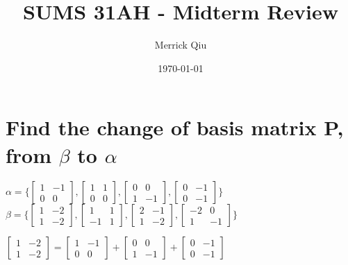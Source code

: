\documentclass[12pt, letterpaper, twoside]{article}
\title{SUMS 31AH - Midterm Review}
\author{Merrick Qiu}
\date\today
\newcommand{\gap}{\vspace{2mm}}
\begin{document}
\maketitle
\section{Find the change of basis matrix P, from $\beta$ to $\alpha$}

$\alpha = \{
    \begin{bmatrix}
        1 & -1\\
        0 & 0
    \end{bmatrix},
    \begin{bmatrix}
        1 & 1\\
        0 & 0
    \end{bmatrix},
    \begin{bmatrix}
        0 & 0\\
        1 & -1
    \end{bmatrix},
    \begin{bmatrix}
        0 & -1\\
        0 & -1
    \end{bmatrix}
\}$ \\
$\beta = \{
    \begin{bmatrix}
        1 & -2\\
        1 & -2
    \end{bmatrix},
    \begin{bmatrix}
        1 & 1\\
        -1 & 1
    \end{bmatrix},
    \begin{bmatrix}
        2 & -1\\
        1 & -2
    \end{bmatrix},
    \begin{bmatrix}
        -2 & 0\\
        1 & -1
    \end{bmatrix}
\}$\gap

$\begin{bmatrix}
    1 & -2\\
    1 & -2
\end{bmatrix} =
\begin{bmatrix}
    1 & -1\\
    0 & 0
\end{bmatrix} + 
\begin{bmatrix}
    0 & 0\\
    1 & -1
\end{bmatrix} + 
\begin{bmatrix}
    0 & -1\\
    0 & -1
\end{bmatrix}$
\end{document}
